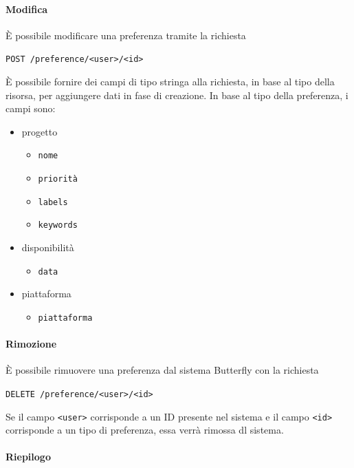 \paragraph{Modifica}

È possibile modificare una preferenza tramite la richiesta
\begin{center}
    \texttt{POST /preference/<user>/<id>}
\end{center}


È possibile fornire dei campi di tipo stringa alla richiesta, in base al tipo della risorsa, per aggiungere dati in fase di creazione.
In base al tipo della preferenza, i campi sono:
\begin{itemize}[noitemsep]
    \item progetto
        \begin{itemize}[noitemsep]
            \item \texttt{nome}
            \item \texttt{priorità}
            \item \texttt{labels}
            \item \texttt{keywords}
        \end{itemize}
    \item disponibilità
        \begin{itemize}[noitemsep]
            \item \texttt{data}
        \end{itemize}
    \item piattaforma
        \begin{itemize}[noitemsep]
            \item \texttt{piattaforma}
        \end{itemize}
\end{itemize}


\paragraph{Rimozione}

È possibile rimuovere una preferenza dal sistema Butterfly con la richiesta
\begin{center}
    \texttt{DELETE /preference/<user>/<id>}
\end{center}

Se il campo \texttt{<user>} corrisponde a un ID presente nel sistema e il campo \texttt{<id>} corrisponde a un tipo di preferenza, essa verrà rimossa dl sistema.

\paragraph{Riepilogo}

